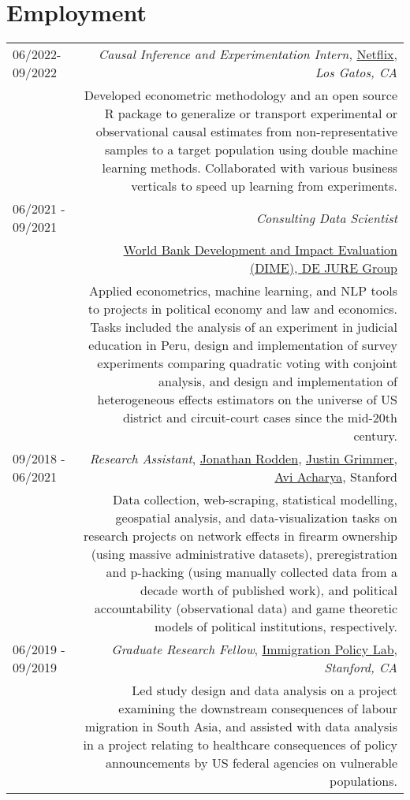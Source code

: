 \section*{Employment}
\begin{longtable}{L!{\VRule}R}
06/2022- 09/2022 & \emph{Causal Inference and Experimentation Intern,}
  \href{https://research.netflix.com/}{Netflix}, \emph{Los Gatos, CA} \\

& \small Developed econometric methodology and an open source R
package to generalize or transport experimental or observational
causal estimates from non-representative samples to a target
population using double machine learning methods. Collaborated with
various business verticals to speed up learning from experiments.
\\[2pt]

06/2021 - 09/2021 & \emph{Consulting Data Scientist} \\
& \href{https://www.worldbank.org/en/research/dime/brief/dime-governance-program}{World
  Bank Development and Impact Evaluation (DIME), DE JURE Group} \\ &
\small Applied econometrics, machine learning, and NLP tools
  to projects in political economy and law and economics. Tasks included
  the analysis of an experiment in judicial education in Peru, design
  and implementation of survey experiments comparing quadratic voting
  with conjoint analysis, and design and implementation of heterogeneous effects estimators on the universe of US district and circuit-court cases since the mid-20th century.\\[2pt]
09/2018 - 06/2021 &

\emph{Research Assistant},
\href{http://www.jonathanrodden.com/}{Jonathan Rodden},
\href{https://www.justingrimmer.org/}{Justin Grimmer},
\href{https://stanford.edu/~avidit/}{Avi Acharya}, Stanford\\
& \small Data collection, web-scraping, statistical modelling,
geospatial analysis, and data-visualization tasks on research projects
on network effects in firearm ownership (using massive administrative
datasets), preregistration and p-hacking (using manually collected
data from a decade worth of published work), and political accountability
(observational data) and game theoretic models of political
institutions, respectively. \\[2pt]

06/2019 - 09/2019 & \emph{Graduate Research Fellow},
\href{https://immigrationlab.org/}{Immigration Policy Lab},
\emph{Stanford, CA} \\ & \small Led study design and data analysis on
a project examining the downstream consequences of labour migration in
South Asia, and assisted with data analysis in a project relating to
healthcare consequences of policy announcements by US federal agencies
on vulnerable populations. \\[2pt]


\end{longtable}
